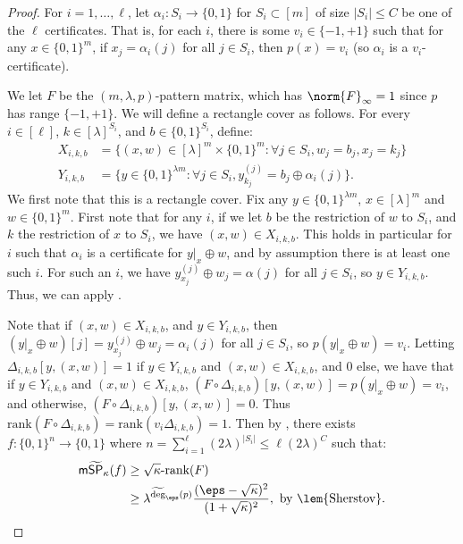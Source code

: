 \documentclass{toc}
\begin{document}
\begin{proof}
For $i=1,\dots,\ell$, let $\alpha_i:S_i\rightarrow\{0,1\}$ for $S_i\subset[m]$ of size $|S_i|\leq C$ be one of the $\ell$ certificates. That is, for each $i$, there is some $v_i\in\{-1,+1\}$ such that for any $x\in\{0,1\}^m$, if $x_j=\alpha_i(j)$ for all $j\in S_i$, then $p(x)=v_i$ (so $\alpha_i$ is a $v_i$-certificate). 

We let $F$ be the $(m,\lambda,p)$-pattern matrix, which has $\norm{F}_\infty=1$ since $p$ has range $\{-1,+1\}$. We will define a rectangle cover as follows. 
For every $i\in[\ell]$, $k\in [\lambda]^{S_i}$, and $b\in\{0,1\}^{S_i}$, define:
\begin{align*}
X_{i,k,b} &= \{(x,w)\in [\lambda]^m\times\{0,1\}^m:\forall j\in S_i, w_j=b_j, x_j=k_j\}\\
Y_{i,k,b} &=\{y\in\{0,1\}^{\lambda m}:\forall j\in S_i, y_{k_j}^{(j)}=b_j\oplus\alpha_i(j)\}.
\end{align*}
We first note that this is a rectangle cover. Fix any $y\in\{0,1\}^{\lambda m}$, $x\in[\lambda]^m$ and $w\in\{0,1\}^m$.
First note that for any $i$, if we let $b$ be the restriction of $w$ to $S_i$, and $k$ the restriction of $x$ to $S_i$, we have $(x,w)\in X_{i,k,b}$. This holds in particular for $i$ such that $\alpha_i$ is a certificate for $y|_x\oplus w$, and by assumption there is at least one such $i$. For such an $i$, we have $y^{(j)}_{x_j}\oplus w_j=\alpha(j)$ for all $j\in S_i$, so $y\in Y_{i,k,b}$. Thus, we can apply . 


Note that if $(x,w)\in X_{i,k,b}$, and $y\in Y_{i,k,b}$, then $(y|_x\oplus w)[j]=y^{(j)}_{x_j}\oplus w_j=\alpha_i(j)$ for all $j\in S_i$, so $p(y|_x\oplus w)=v_i$.
Letting $\Delta_{i,k,b}[y,(x,w)]=1$ if $y\in Y_{i,k,b}$ and $(x,w)\in X_{i,k,b}$, and 0 else, we have that if $y\in Y_{i,k,b}$ and $(x,w)\in X_{i,k,b}$, $(F\circ\Delta_{i,k,b})[y,(x,w)]=p(y|_x\oplus w)=v_i$, and otherwise, $(F\circ\Delta_{i,k,b})[y,(x,w)]=0$.
Thus $\mathrm{rank}(F\circ\Delta_{i,k,b})=\mathrm{rank}(v_i\Delta_{i,k,b})=1$. 
Then by , there exists $f:\{0,1\}^n\rightarrow\{0,1\}$ where $n=\sum_{i=1}^{\ell}(2\lambda)^{|S_i|}\leq \ell (2\lambda)^C$ such that:
\begin{align*}
\mathsf{m}\widetilde{\mathsf{SP}}_{\kappa}(f) &\geq \sqrt{\kappa}\mbox{-rank}(F)\\
&\geq \lambda^{\widetilde{\deg}_\eps(p)}\frac{(\eps-\sqrt{\kappa})^2}{(1+\sqrt{\kappa})^2}, \mbox{ by \lem{Sherstov}.}\qedhere
\end{align*}
\end{proof}
\end{document}
